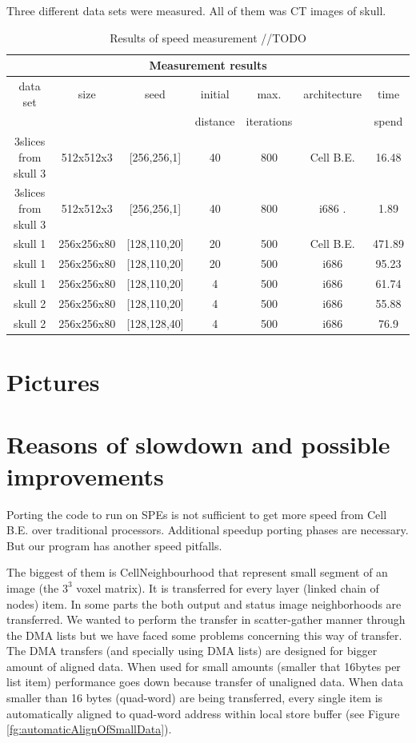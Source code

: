 Three different data sets were measured.
All of them was CT images of skull.

\begin{table}
\centering
\begin{tabular}{|c|c|c|c|c|c|c|}
\hline
\multicolumn{7}{|c|}{Measurement results}\\
\hline
data set		&size		&seed		&initial	&max. 		&architecture	&time\\
			&		&		&distance	&iterations	&		&spend\\
\hline
\hline
3slices from skull 3	&512x512x3	&[256,256,1]	&40		&800		&Cell B.E.	&16.48\\
3slices from skull 3	&512x512x3	&[256,256,1]	&40		&800		&i686	.	&1.89\\
\hline
\hline
skull 1			&256x256x80	&[128,110,20]	&20		&500		&Cell B.E.	&471.89\\
skull 1			&256x256x80	&[128,110,20]	&20		&500		&i686		&95.23\\
\hline
\hline
skull 1			&256x256x80	&[128,110,20]	&4		&500		&i686		&61.74\\
\hline
\hline
skull 2			&256x256x80	&[128,110,20]	&4		&500		&i686		&55.88\\
\hline
\hline
skull 2			&256x256x80	&[128,128,40]	&4		&500		&i686		&76.9\\
\hline
\end{tabular}
\par
\caption[Measurement results]
{
  Results of speed measurement //TODO
}
\label{tab:runresults}
\end{table}

\section{Pictures}

\section{Reasons of slowdown and possible improvements}

\par
Porting the code to run on SPEs is not sufficient to get more speed from Cell B.E. over traditional processors.
Additional speedup porting phases are necessary.
But our program has another speed pitfalls.

\par
The biggest of them is CellNeighbourhood that represent small segment of an image (the $3^3$ voxel matrix).
It is transferred for every layer (linked chain of nodes) item.
In some parts the both output and status image neighborhoods are transferred.
We wanted to perform the transfer in scatter-gather manner through the DMA lists but we have faced some problems concerning this way of transfer.
The DMA transfers (and specially using DMA lists) are designed for bigger amount of aligned data.
When used for small amounts (smaller that 16bytes per list item) performance goes down because transfer of unaligned data.
When data smaller than 16 bytes (quad-word) are being transferred, every single item is automatically aligned to quad-word address within local store buffer (see Figure \ref{fg:automaticAlignOfSmallData}).

